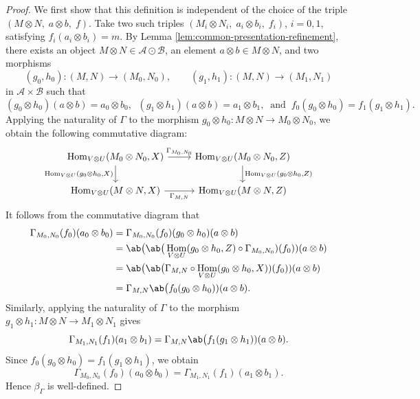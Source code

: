 \documentclass[12pt, english]{article}
\numberwithin{equation}{section}
\DeclareMathOperator{\Hom}{Hom}
\theoremstyle{plain}
\theoremstyle{definition}
\theoremstyle{remark}
\begin{document}
\begin{proof}
		We first show that this definition is independent of the choice of the triple $(M\otimes N, \; a \otimes b, \; f)$.
		Take two such triples $(M_i\otimes N_i, \; a_i\otimes b_i, \; f_i)$, $i = 0, 1$, satisfying $f_i(a_i\otimes b_i) = m$.
		By Lemma \ref{lem:common-presentation-refinement}, there exists an object $M \otimes N \in \mathcal{A} \odot \mathcal{B}$,
		an element $a \otimes b \in M \otimes N$,
		and two morphisms
		\[
		(g_0, h_0) \colon (M, N) \longrightarrow (M_0, N_0), \qquad
		(g_1, h_1) \colon (M, N) \longrightarrow (M_1, N_1)
		\]
		in $\mathcal{A} \times \mathcal{B} $ such that
		\[
		(g_0 \otimes h_0) (a \otimes b) = a_0 \otimes b_0, \;\; (g_1 \otimes h_1) (a \otimes b) = a_1 \otimes b_1,
		\;\; \text{and} \;\; f_0 (g_0 \otimes h_0) = f_1 (g_1 \otimes h_1).
		\]
		Applying the naturality of $\Gamma$ to the morphism $g_0 \otimes h_0 \colon M \otimes N \longrightarrow M_0 \otimes N_0$, we obtain the following commutative diagram:
		\[
		\begin{tikzcd}
			\Hom_{V \otimes U}(M_0 \otimes N_0, X)
			\arrow[r, "{\Gamma_{M_0, N_0}}"]
			\arrow[d, "{\Hom_{V \otimes U}(g_0 \otimes h_0, X)}"']
			&
			\Hom_{V \otimes U}(M_0 \otimes N_0, Z)
			\arrow[d, "{\Hom_{V \otimes U}(g_0 \otimes h_0, Z)}"] \\
			\Hom_{V \otimes U}(M \otimes N, X)
			\arrow[r, "{\Gamma_{M, N}}"']
			&
			\Hom_{V \otimes U}(M \otimes N, Z)
		\end{tikzcd}
		\]
		It follows from the commutative diagram that
		\begin{align*}
			\Gamma_{M_0, N_0}(f_0) (a_0 \otimes b_0) & = \Gamma_{M_0, N_0}(f_0) (g_0 \otimes h_0) (a \otimes b) \\
			& = \ab\big(\ab\big(\Hom_{V \otimes U}(g_0 \otimes h_0, Z) \circ \Gamma_{M_0, N_0}) (f_0)) (a \otimes b) \\
			& = \ab\big(\ab\big(\Gamma_{M, N} \circ \Hom_{V \otimes U}(g_0 \otimes h_0, X)) (f_0)) (a \otimes b) \\
			& = \Gamma_{M, N} \ab\big(f_0 (g_0 \otimes h_0)) (a \otimes b).
		\end{align*}
		Similarly, applying the naturality of $\Gamma$ to the morphism $g_1 \otimes h_1\colon M \otimes N \to M_1\otimes N_1$ gives
		\[
		\Gamma_{M_1, N_1}(f_1) (a_1 \otimes b_1) = \Gamma_{M, N} \ab\big(f_1 (g_1 \otimes h_1)) (a \otimes b).
		\]
		Since $f_0 (g_0 \otimes h_0) = f_1 (g_1 \otimes h_1)$, we obtain
		\[
		\Gamma_{M_0, N_0}(f_0) (a_0 \otimes b_0) = \Gamma_{M_1, N_1}(f_1) (a_1 \otimes b_1).
		\]
		Hence $\beta_{\Gamma}$ is well-defined.
		

\end{proof}
\end{document}
